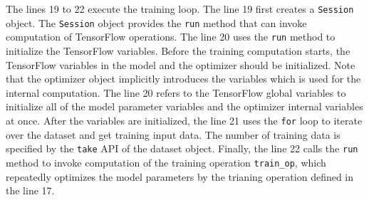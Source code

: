 The lines 19 to 22 execute the training loop. 
The line 19 first creates a {\tt Session} object.
The {\tt Session} object provides the {\tt run} method that can invoke
computation of TensorFlow operations.
The line 20 uses the {\tt run} method to initialize the TensorFlow variables.
Before the training computation starts,
the TensorFlow variables in the model and the optimizer should be initialized.
Note that the optimizer object implicitly introduces the variables which is
used for the internal computation.
The line 20 refers to the TensorFlow global variables to initialize
all of the model parameter variables and the optimizer internal variables
at once.
After the variables are initialized, the line 21 uses the {\tt for} loop
to iterate over the dataset and get training input data. 
The number of training data is specified by the {\tt take} API of the
dataset object.
Finally, the line 22 calls the {\tt run} method to
invoke computation of the training operation {\tt train\_op},
which repeatedly optimizes the model parameters by the trianing operation
defined in the line 17.


